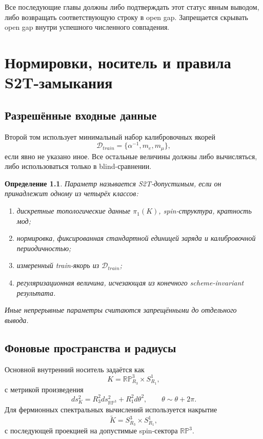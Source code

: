 \documentclass[12pt,a4paper]{report}
\newtheorem{definition}{Определение}[chapter]
\theoremstyle{remark}
\begin{document}
Все последующие главы должны либо подтверждать этот статус явным выводом, либо возвращать соответствующую строку в open gap. Запрещается скрывать open gap внутри успешного численного совпадения.

\chapter{Нормировки, носитель и правила S2T-замыкания}

\section{Разрешённые входные данные}

Второй том использует минимальный набор калибровочных якорей
\begin{equation}
    \mathcal{D}_{train}=\{\alpha^{-1},m_e,m_\mu\},
\end{equation}
если явно не указано иное. Все остальные величины должны либо вычисляться, либо использоваться только в blind-сравнении.

\begin{definition}
Параметр называется S2T-допустимым, если он принадлежит одному из четырёх классов:
\begin{enumerate}
    \item дискретные топологические данные \(\pi_1(K)\), spin-структура, кратность мод;
    \item нормировка, фиксированная стандартной единицей заряда и калибровочной периодичностью;
    \item измеренный train-якорь из \(\mathcal{D}_{train}\);
    \item регуляризационная величина, исчезающая из конечного scheme-invariant результата.
\end{enumerate}
Иные непрерывные параметры считаются запрещёнными до отдельного вывода.
\end{definition}

\section{Фоновые пространства и радиусы}

Основной внутренний носитель задаётся как
\begin{equation}
    K=\mathbb{RP}^3_{R_3}\times S^1_{R_1},
\end{equation}
с метрикой произведения
\begin{equation}
    ds_K^2=R_3^2 ds_{\mathbb{RP}^3}^2+R_1^2 d\theta^2,
    \qquad \theta\sim \theta+2\pi.
\end{equation}
Для фермионных спектральных вычислений используется накрытие
\begin{equation}
    \widetilde K=S^3_{R_3}\times S^1_{R_1},
\end{equation}
с последующей проекцией на допустимые spin-сектора \(\mathbb{RP}^3\).
\end{document}
